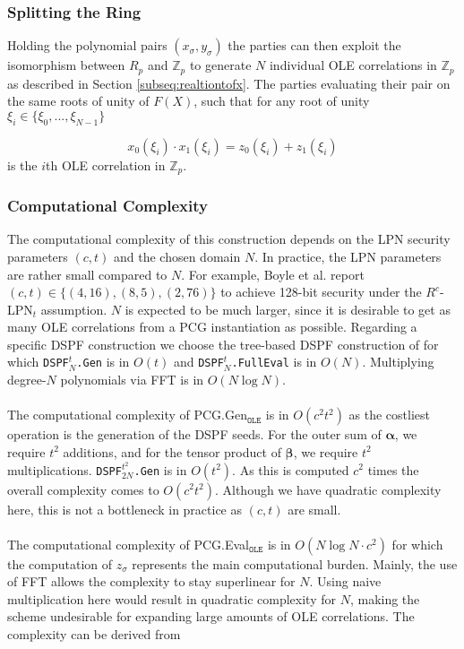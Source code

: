 \subsubsection{Splitting the Ring}

Holding the polynomial pairs $(x_\sigma , y_\sigma)$ the parties can then exploit the isomorphism between $R_p$ and $\mathbb{Z}_{p}$ to generate $N$ individual OLE correlations in $\mathbb{Z}_{p}$ as described in Section \ref{subseq:realtiontofx}. The parties evaluating their pair on the same roots of unity of $F(X)$, such that for any root of unity $\xi_i \in \{\xi_0, ...,\xi_{N-1}\}$

\begin{equation}
x_0(\xi_i) \cdot x_1(\xi_i) = z_0(\xi_i)+ z_1(\xi_i)
\end{equation}
is the $i$th OLE correlation in $\mathbb{Z}_{p}$.

\subsubsection{Computational Complexity}
The computational complexity of this construction depends on the LPN security parameters $(c, t)$ and the chosen domain $N$. In practice, the LPN parameters are rather small compared to $N$. For example, Boyle et al. \cite{boyle2020efficient} report $(c,t) \in \{(4,16),(8,5),(2,76)\}$ to achieve 128-bit security under the $R^c$-LPN$_t$ assumption. $N$ is expected to be much larger, since it is desirable to get as many OLE correlations from a PCG instantiation as possible. Regarding a specific DSPF construction we choose the tree-based DSPF construction of \cite{boyle2016function} for which \texttt{DSPF$^{t}_{N}$.Gen} is in $O(t)$ and \texttt{DSPF$^{t}_{N}$.FullEval} is in $O(N)$. Multiplying degree-$N$ polynomials via FFT is in $O(N\log N)$.
\\\\
The computational complexity of PCG.Gen$_{\texttt{OLE}}$ is in $O(c^2t^2)$ as the costliest operation is the generation of the DSPF seeds. For the outer sum of $\boldsymbol{\alpha}$, we require $t^2$ additions, and for the tensor product of $\boldsymbol{\beta}$, we require $t^2$ multiplications. \texttt{DSPF$^{t^2}_{2N}$.Gen} is in $O(t^2)$. As this is computed $c^2$ times the overall complexity comes to $O(c^2t^2)$. Although we have quadratic complexity here, this is not a bottleneck in practice as $(c,t)$ are small.
\\\\
The computational complexity of PCG.Eval$_{\texttt{OLE}}$ is in $O(N\log N \cdot c^2)$ for which the computation of $z_\sigma$ represents the main computational burden. Mainly, the use of FFT allows the complexity to stay superlinear for $N$. Using naive multiplication here would result in quadratic complexity for $N$, making the scheme undesirable for expanding large amounts of OLE correlations. The complexity can be derived from

